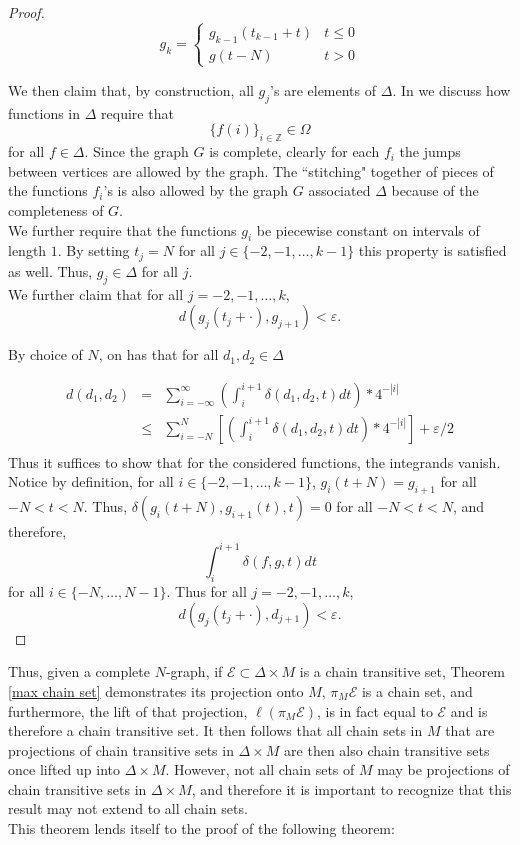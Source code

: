\documentclass[11pt]{article}
\begin{document}
\begin{proof}
   $$g_k=\left\{
     \begin{array}{lr}
       g_{k-1}(t_{k-1}+t) &  t\leq 0\\
       g(t-N) &  t>0
     \end{array}
   \right.$$

We then claim that, by construction, all $g_j$'s are elements of $\Delta$.  In \cite{Ayers2013} we discuss how functions in $\Delta$ require that 
$$\{f(i)\}_{i\in\mathbb{Z}}\in\Omega$$ for all $f\in\Delta$. Since the graph $G$ is complete, clearly for each $f_i$ the jumps between vertices are allowed by the graph.  The ``stitching" together of pieces of the functions $f_i$'s is also allowed by the graph $G$ associated $\Delta$ because of the completeness of $G$. \\
We further require that the functions $g_i$ be piecewise constant on intervals of length $1$.  By setting $t_j=N$ for all $j\in\{-2,-1,\ldots,k-1\}$ this property is satisfied as well.  Thus, $g_j\in\Delta$ for all $j$.
 \\



\indent We further claim that for all $j=-2,-1,\ldots,k$,
$$d(g_j(t_j+\cdot),g_{j+1})<\varepsilon.$$

By choice of $N$, on has that for all $d_1,d_2\in\Delta$

\begin{eqnarray*}
d(d_1,d_2)&=& \displaystyle\sum_{i=-\infty}^\infty \left(\displaystyle\int_{i}^{i+1}\delta(d_1,d_2,t)dt\right)*4^{-|i|}\\
&\leq& \displaystyle\sum_{i=-N}^N\left[ \left(\displaystyle\int_{i}^{i+1}\delta(d_1,d_2,t)dt\right)*4^{-|i|}\right] +\varepsilon/2\\
\end{eqnarray*}
Thus it suffices to show that for the considered functions, the integrands vanish.  Notice by definition, for all $i\in\{-2,-1,\ldots,k-1\}$,
$g_i(t+N)=g_{i+1}$ for all $-N<t<N$.  Thus, 
$\delta(g_i(t+N),g_{i+1}(t),t)=0$ for all $-N<t<N$, and therefore,
$$\displaystyle\int_{i}^{i+1}\delta(f,g,t)dt$$ for all $i\in\{-N,\ldots,N-1\}$.
Thus for all $j=-2,-1,\ldots,k$,
$$d(g_j(t_j+\cdot),d_{j+1})<\varepsilon.$$
\end{proof}
Thus, given a complete $N$-graph, if $\mathcal{E}\subset\Delta\times M$ is a chain transitive set, Theorem \ref{max chain set} demonstrates its projection onto $M$, $\pi_M\mathcal{E}$ is a chain set, and furthermore, the lift of that projection, $\ell(\pi_M\mathcal{E})$, is in fact equal to $\mathcal{E}$ and is therefore a chain transitive set.  It then follows that all chain sets in $M$ that are projections of chain transitive sets in $\Delta\times M$ are then also chain transitive sets once lifted up into $\Delta\times M$.  However, not all chain sets of $M$ may be projections of chain transitive sets in $\Delta\times M$, and therefore it is important to recognize that this result may not extend to all chain sets. \\
This theorem lends itself to the proof of the following theorem:
\end{document}
